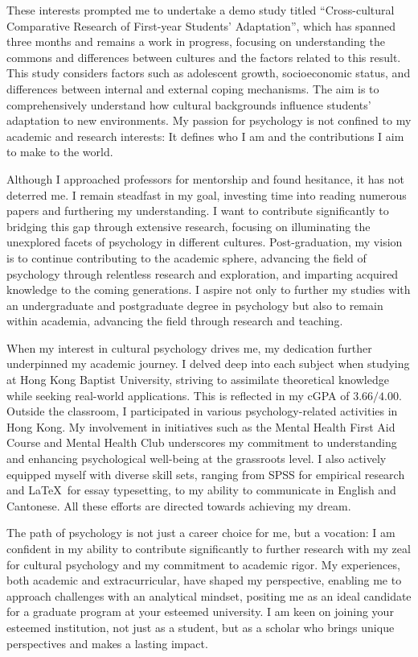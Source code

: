 \documentclass[]{article}
\begin{document}
These interests prompted me to undertake a demo study titled ``Cross-cultural Comparative Research of First-year Students' Adaptation'', which has spanned three months and remains a work in progress, focusing on understanding the commons and differences between cultures and the factors related to this result.
This study considers factors such as adolescent growth, socioeconomic status, and differences between internal and external coping mechanisms.
The aim is to comprehensively understand how cultural backgrounds influence students' adaptation to new environments.
My passion for psychology is not confined to my academic and research interests: It defines who I am and the contributions I aim to make to the world.

Although I approached professors for mentorship and found hesitance, it has not deterred me.
I remain steadfast in my goal, investing time into reading numerous papers and furthering my understanding.
I want to contribute significantly to bridging this gap through extensive research, focusing on illuminating the unexplored facets of psychology in different cultures.
Post-graduation, my vision is to continue contributing to the academic sphere, advancing the field of psychology through relentless research and exploration, and imparting acquired knowledge to the coming generations.
I aspire not only to further my studies with an undergraduate and postgraduate degree in psychology but also to remain within academia, advancing the field through research and teaching.

When my interest in cultural psychology drives me, my dedication further underpinned my academic journey.%
I delved deep into each subject when studying at Hong Kong Baptist University, striving to assimilate theoretical knowledge while seeking real-world applications.
This is reflected in my cGPA of $3.66/4.00$.
Outside the classroom, I participated in various psychology-related activities in Hong Kong.
My involvement in initiatives such as the Mental Health First Aid Course and Mental Health Club underscores my commitment to understanding and enhancing psychological well-being at the grassroots level.
I also actively equipped myself with diverse skill sets, ranging from SPSS for empirical research and \LaTeX\ for essay typesetting, to my ability to communicate in English and Cantonese.
All these efforts are directed towards achieving my dream.

The path of psychology is not just a career choice for me, but a vocation: I am confident in my ability to contribute significantly to further research with my zeal for cultural psychology and my commitment to academic rigor.
My experiences, both academic and extracurricular, have shaped my perspective, enabling me to approach challenges with an analytical mindset, positing me as an ideal candidate for a graduate program at your esteemed university.
I am keen on joining your esteemed institution, not just as a student, but as a scholar who brings unique perspectives and makes a lasting impact.
\end{document}
